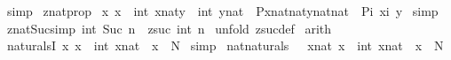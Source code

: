 \begin{isabellebody}
%
\isadelimproof
%
\endisadelimproof
%
\isatagproof
{}\isamarkupfalse%
\ simp\isanewline
{}\isamarkupfalse%
%
\endisatagproof
{\isafoldproof}%
%
\isadelimproof
\isanewline
%
\endisadelimproof
\isanewline
{}\isamarkupfalse%
\ znatprop{}{\isacharcolon}\ \isanewline
{\isachardoublequoteopen}{\isacharbang}{\isacharbang}x{\isachardot}\ {\isacharbrackleft}{\isacharbar}x\ {\isacharequal}\ int\ xnat{\isacharsemicolon}y\ {\isacharequal}\ int\ ynat{\isacharbar}{\isacharbrackright}\ {\isacharequal}{\isacharequal}{\isachargreater}\ P{\isacharparenleft}xnat{\isacharcolon}{\isacharcolon}nat{\isacharparenright}{\isacharparenleft}ynat{\isacharcolon}{\isacharcolon}nat{\isacharparenright}\ {\isacharequal}\ P{\isacharparenleft}{\isachardollar}i\ x{\isacharparenright}{\isacharparenleft}{\isachardollar}i\ y{\isacharparenright}{\isachardoublequoteclose}\isanewline
%
\isadelimproof
%
\endisadelimproof
%
\isatagproof
{}\isamarkupfalse%
\ simp\isanewline
{}\isamarkupfalse%
%
\endisatagproof
{\isafoldproof}%
%
\isadelimproof
\isanewline
%
\endisadelimproof
\isanewline
\isanewline
{}\isamarkupfalse%
\ znat{\isacharunderscore}Suc{\isacharbrackleft}simp{\isacharbrackright}{\isacharcolon}\ {\isachardoublequoteopen}int\ {\isacharparenleft}Suc\ n{\isacharparenright}\ {\isacharequal}\ zsuc\ {\isacharparenleft}int\ n{\isacharparenright}{\isachardoublequoteclose}\isanewline
%
\isadelimproof
%
\endisadelimproof
%
\isatagproof
{}\isamarkupfalse%
\ {\isacharparenleft}unfold\ zsuc{\isacharunderscore}def{\isacharparenright}\isanewline
{}\isamarkupfalse%
\ {\isacharparenleft}arith{\isacharparenright}\isanewline
{}\isamarkupfalse%
%
\endisatagproof
{\isafoldproof}%
%
\isadelimproof
\isanewline
%
\endisadelimproof
\isanewline
\isanewline
{}\isamarkupfalse%
\ naturalsI{\isacharcolon}\ {\isachardoublequoteopen}{\isacharbang}{\isacharbang}x{\isachardot}\ x\ {\isacharequal}\ int\ xnat\ {\isacharequal}{\isacharequal}{\isachargreater}\ {\isacharparenleft}x\ {\isacharcolon}\ {\isacharpercent}N{\isacharparenright}{\isachardoublequoteclose}\isanewline
%
\isadelimproof
%
\endisadelimproof
%
\isatagproof
{}\isamarkupfalse%
\ simp\isanewline
{}\isamarkupfalse%
%
\endisatagproof
{\isafoldproof}%
%
\isadelimproof
\isanewline
%
\endisadelimproof
\isanewline
{}\isamarkupfalse%
\ nat{}naturals{\isacharcolon}\ \ {\isachardoublequoteopen}{\isacharparenleft}{\isacharquery}\ xnat{\isachardot}\ x\ {\isacharequal}\ int\ xnat{\isacharparenright}\ {\isacharequal}\ {\isacharparenleft}x\ {\isacharcolon}\ {\isacharpercent}N{\isacharparenright}{\isachardoublequoteclose}\isanewline

\end{isabellebody}
